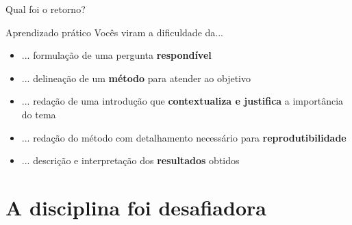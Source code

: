 \documentclass{beamer}
\begin{document}
\begin{frame}{\scriptsize Qual foi o retorno?}
  \begin{block}{Aprendizado prático}
    {\tiny \centering Vocês viram a dificuldade da...}
    \bigskip
    \begin{itemize}
      \scriptsize
    \item<1,6> ... formulação de uma pergunta {\bf respondível}
      \bigskip
    \item<2,6> ... delineação de um {\bf método} para atender ao objetivo
      \bigskip
    \item<3,6> {... redação de uma introdução que {\bf contextualiza e justifica} a importância do tema}
      \bigskip
    \item<4,6> ... redação do método com detalhamento necessário para {\bf reprodutibilidade} 
      \bigskip
    \item<5,6> ... descrição e interpretação dos {\bf resultados} obtidos
    \end{itemize}
  \end{block}
    \vfill
\end{frame}

\section{A disciplina foi desafiadora}
\end{document}
